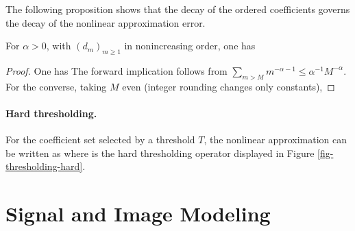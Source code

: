 The following proposition shows that the decay of the ordered coefficients governs the decay of the nonlinear approximation error.

\begin{prop}\label{prop-equiv-comp-decay}
For $\alpha>0$, with $(d_m)_{m\geq1}$ in nonincreasing order, one has
\end{prop}

\begin{proof}
One has
The forward implication follows from $\sum_{m>M}m^{-\alpha-1}\leq\alpha^{-1}M^{-\alpha}$. For the converse, taking $M$ even (integer rounding changes only constants),
\end{proof}




\paragraph{Hard thresholding.}
 
For the coefficient set selected by a threshold $T$, the nonlinear approximation can be written as
where 
is the hard thresholding operator displayed in Figure \ref{fig-thresholding-hard}.




\section{Signal and Image Modeling}
\label{sec-signal-models}

